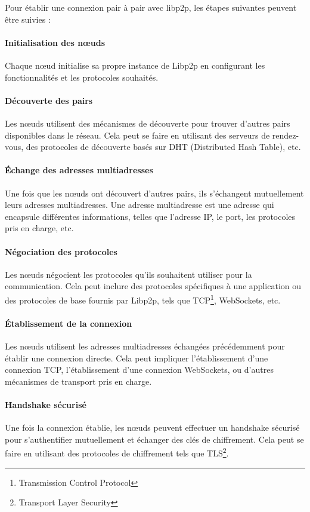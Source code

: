 Pour établir une connexion pair à pair avec libp2p, les étapes suivantes peuvent être suivies :
\paragraph{Initialisation des nœuds}
Chaque nœud initialise sa propre instance de Libp2p en configurant les fonctionnalités et les protocoles souhaités.

\paragraph{Découverte des pairs}
Les nœuds utilisent des mécanismes de découverte pour trouver d'autres pairs disponibles dans le réseau. Cela peut se faire en utilisant des serveurs de rendez-vous, des protocoles de découverte basés sur DHT (Distributed Hash Table), etc.

\paragraph{Échange des adresses multiadresses}
Une fois que les nœuds ont découvert d'autres pairs, ils s'échangent mutuellement leurs adresses multiadresses. Une adresse multiadresse est une adresse qui encapsule différentes informations, telles que l'adresse IP, le port, les protocoles pris en charge, etc.

\paragraph{Négociation des protocoles}
Les nœuds négocient les protocoles qu'ils souhaitent utiliser pour la communication. Cela peut inclure des protocoles spécifiques à une application ou des protocoles de base fournis par Libp2p, tels que TCP\footnote{Transmission Control Protocol}, WebSockets, etc.

\paragraph{Établissement de la connexion}
Les nœuds utilisent les adresses multiadresses échangées précédemment pour établir une connexion directe. Cela peut impliquer l'établissement d'une connexion TCP, l'établissement d'une connexion WebSockets, ou d'autres mécanismes de transport pris en charge.

\paragraph{Handshake sécurisé}  
Une fois la connexion établie, les nœuds peuvent effectuer un handshake sécurisé pour s'authentifier mutuellement et échanger des clés de chiffrement. Cela peut se faire en utilisant des protocoles de chiffrement tels que TLS\footnote{Transport Layer Security}.


